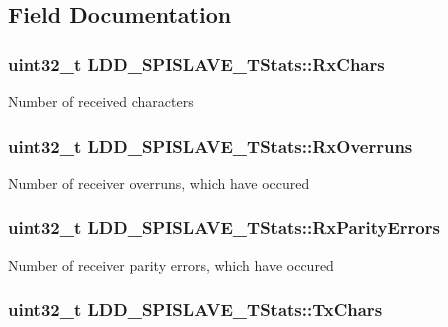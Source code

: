 \subsection{Field Documentation}
\hypertarget{struct_l_d_d___s_p_i_s_l_a_v_e___t_stats_a91f6acf13143110968772d344d352fc6}{
\subsubsection[{Rx\-Chars}]{\setlength{\rightskip}{0pt plus 5cm}uint32\-\_\-t L\-D\-D\-\_\-\-S\-P\-I\-S\-L\-A\-V\-E\-\_\-\-T\-Stats\-::\-Rx\-Chars}}\label{struct_l_d_d___s_p_i_s_l_a_v_e___t_stats_a91f6acf13143110968772d344d352fc6}
Number of received characters \hypertarget{struct_l_d_d___s_p_i_s_l_a_v_e___t_stats_a82edd5dc5e18e7cd6a047d0efbda97ae}{
\subsubsection[{Rx\-Overruns}]{\setlength{\rightskip}{0pt plus 5cm}uint32\-\_\-t L\-D\-D\-\_\-\-S\-P\-I\-S\-L\-A\-V\-E\-\_\-\-T\-Stats\-::\-Rx\-Overruns}}\label{struct_l_d_d___s_p_i_s_l_a_v_e___t_stats_a82edd5dc5e18e7cd6a047d0efbda97ae}
Number of receiver overruns, which have occured \hypertarget{struct_l_d_d___s_p_i_s_l_a_v_e___t_stats_abef442625b92cf52c2ff04edf6894dd3}{
\subsubsection[{Rx\-Parity\-Errors}]{\setlength{\rightskip}{0pt plus 5cm}uint32\-\_\-t L\-D\-D\-\_\-\-S\-P\-I\-S\-L\-A\-V\-E\-\_\-\-T\-Stats\-::\-Rx\-Parity\-Errors}}\label{struct_l_d_d___s_p_i_s_l_a_v_e___t_stats_abef442625b92cf52c2ff04edf6894dd3}
Number of receiver parity errors, which have occured \hypertarget{struct_l_d_d___s_p_i_s_l_a_v_e___t_stats_ab674ba50318e198a1ee9dea0692ce239}{
\subsubsection[{Tx\-Chars}]{\setlength{\rightskip}{0pt plus 5cm}uint32\-\_\-t L\-D\-D\-\_\-\-S\-P\-I\-S\-L\-A\-V\-E\-\_\-\-T\-Stats\-::\-Tx\-Chars}}\label{struct_l_d_d___s_p_i_s_l_a_v_e___t_stats_ab674ba50318e198a1ee9dea0692ce239}
